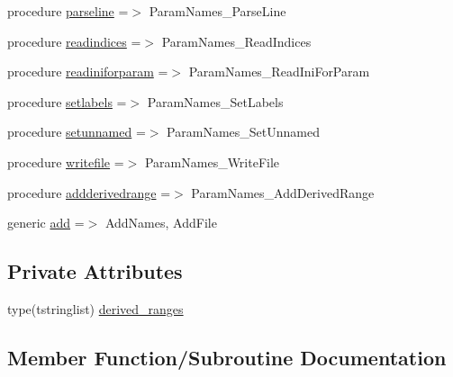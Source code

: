 \begin{DoxyCompactItemize}
\item 
procedure \mbox{\hyperlink{structparamnames_1_1tparamnames_ad57669d1a62d3684c1260fda73d3369c}{parseline}} =$>$ Param\+Names\+\_\+\+Parse\+Line
\item 
procedure \mbox{\hyperlink{structparamnames_1_1tparamnames_a4ee3fba21966b7af628b4900dcedfa98}{readindices}} =$>$ Param\+Names\+\_\+\+Read\+Indices
\item 
procedure \mbox{\hyperlink{structparamnames_1_1tparamnames_ae2ae840a0b2d94f40fe5f4bcd2ccd386}{readiniforparam}} =$>$ Param\+Names\+\_\+\+Read\+Ini\+For\+Param
\item 
procedure \mbox{\hyperlink{structparamnames_1_1tparamnames_a322403a9bb14ad216c7fe72fc6708fbb}{setlabels}} =$>$ Param\+Names\+\_\+\+Set\+Labels
\item 
procedure \mbox{\hyperlink{structparamnames_1_1tparamnames_afacedad68652a1f8dfc3c2752441eaf7}{setunnamed}} =$>$ Param\+Names\+\_\+\+Set\+Unnamed
\item 
procedure \mbox{\hyperlink{structparamnames_1_1tparamnames_a11fc60c01d47eedde725732435d1ff6d}{writefile}} =$>$ Param\+Names\+\_\+\+Write\+File
\item 
procedure \mbox{\hyperlink{structparamnames_1_1tparamnames_a812f5a89e6f8d5684181ec6b216cddd0}{addderivedrange}} =$>$ Param\+Names\+\_\+\+Add\+Derived\+Range
\item 
generic \mbox{\hyperlink{structparamnames_1_1tparamnames_a3ee791abb7e2b82c80d9167721f388c0}{add}} =$>$ Add\+Names, Add\+File
\end{DoxyCompactItemize}
\subsection*{Private Attributes}
\begin{DoxyCompactItemize}
\item 
type(tstringlist) \mbox{\hyperlink{structparamnames_1_1tparamnames_a6b93a9513527c2ea0e8c99603e31c92d}{derived\+\_\+ranges}}
\end{DoxyCompactItemize}


\subsection{Member Function/\+Subroutine Documentation}
\mbox{\label{structparamnames_1_1tparamnames_a3ee791abb7e2b82c80d9167721f388c0}} 

